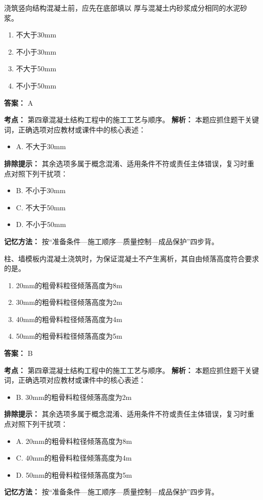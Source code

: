 \documentclass[UTF8,fontset=fandol,11pt]{ctexart}
\begin{document}
\begin{quizbox}[title={第 72 题}]
浇筑竖向结构混凝土前，应先在底部填以 厚与混凝土内砂浆成分相同的水泥砂浆。\\
\begin{enumerate}[label=\Alph*.]
\item 不大于30mm
\item 不小于30mm
\item 不大于50mm
\item 不小于50mm
\end{enumerate}
\textbf{答案：} A
\vspace{0.25em}
\begin{answerbox}[title={考点解析}]
\textbf{考点：} 第四章混凝土结构工程中的施工工艺与顺序。
\textbf{解析：} 本题应抓住题干关键词，正确选项对应教材或课件中的核心表述：
\begin{itemize}
\item A. 不大于30mm
\end{itemize}
\textbf{排除提示：} 其余选项多属于概念混淆、适用条件不符或责任主体错误，复习时重点对照下列干扰项：
\begin{itemize}
\item B. 不小于30mm
\item C. 不大于50mm
\item D. 不小于50mm
\end{itemize}
\textbf{记忆方法：} 按“准备条件—施工顺序—质量控制—成品保护”四步背。
\end{answerbox}
\end{quizbox}

\begin{quizbox}[title={第 73 题}]
柱、墙模板内混凝土浇筑时，为保证混凝土不产生离析，其自由倾落高度符合要求的是。\\
\begin{enumerate}[label=\Alph*.]
\item 20mm的粗骨料粒径倾落高度为8m
\item 30mm的粗骨料粒径倾落高度为2m
\item 40mm的粗骨料粒径倾落高度为4m
\item 50mm的粗骨料粒径倾落高度为5m
\end{enumerate}
\textbf{答案：} B
\vspace{0.25em}
\begin{answerbox}[title={考点解析}]
\textbf{考点：} 第四章混凝土结构工程中的施工工艺与顺序。
\textbf{解析：} 本题应抓住题干关键词，正确选项对应教材或课件中的核心表述：
\begin{itemize}
\item B. 30mm的粗骨料粒径倾落高度为2m
\end{itemize}
\textbf{排除提示：} 其余选项多属于概念混淆、适用条件不符或责任主体错误，复习时重点对照下列干扰项：
\begin{itemize}
\item A. 20mm的粗骨料粒径倾落高度为8m
\item C. 40mm的粗骨料粒径倾落高度为4m
\item D. 50mm的粗骨料粒径倾落高度为5m
\end{itemize}
\textbf{记忆方法：} 按“准备条件—施工顺序—质量控制—成品保护”四步背。
\end{answerbox}
\end{quizbox}
\end{document}
